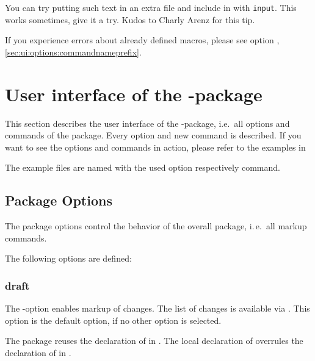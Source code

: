 You can try putting such text in an extra file and include in with \texttt{input}.
This works sometimes, give it a try.
Kudos to Charly Arenz for this tip.

If you experience errors about already defined macros, please see option , \autoref{sec:ui:options:commandnameprefix}.

\cleardoublepage
\section{User interface of the -package}
\label{sec:ui}

This section describes the user interface of the -package, i.e.\ all options and commands of the package.
Every option and new command is described.
If you want to see the options and commands in action, please refer to the examples in


The example files are named with the used option respectively command.

\subsection{Package Options}
\label{sec:ui:options}


The package options control the behavior of the overall package, i.\,e.\ all markup commands.

The following options are defined:

\localtableofcontents



\subsubsection{draft}


The -option enables markup of changes.
The list of changes is available via .
This option is the default option, if no other option is selected.

The  package reuses the declaration of  in .
The local declaration of  overrules the declaration of  in .

